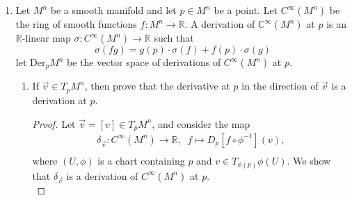 \documentclass{article}
\begin{document}
\begin{enumerate}[label={\bf Q\arabic*:}]
\begin{enumerate}
        \begin{proof}
          Let $p\in S^2\setminus\{\infty\}$. Then
          \[\begin{array}{ll}
            &p\; \text{is a critical point of}\; g \\
            \Leftrightarrow &\exists q\in\phi^{-1}(p)\; \text{such that}\;
              D_qg\; \text{is not surjective} \\
            \Leftrightarrow &D_qg:T_qS^2\rightarrow T_qS^2\; \text{is not
              an isomorphism} \\
            \Leftrightarrow &D_qg\; \text{has no inverse} \\
            \Leftrightarrow &\text{Det}(D_{\phi(a)}\phi\circ
              g\circ\phi^{-1})=0 \\
            \Leftrightarrow &\text{Det}(D_{\phi(a)}f)=0 \\
            \Leftrightarrow &\text{Det}(D_pf)=0 \\
            \Leftrightarrow &f^{-1}(p)=0. \\
          \end{array}\]
        \end{proof}
    \end{enumerate}

  \item Let $M^n$ be a smooth manifold and let $p\in M^n$ be a point. Let
    $C^\infty(M^n)$ be the ring of smooth functions $f:M^n\to\mathbb{R}$. A
    derivation of $\mathbb{C}^\infty(M^n)$ at $p$ is an $\mathbb{R}$-linear
    map $\sigma:C^\infty(M^n)\to\mathbb{R}$ such that
    \[\sigma(fg)=g(p)\cdot \sigma(f)+f(p)\cdot\sigma(g)\] let
    $\text{Der}_pM^n$ be the vector space of derivations of $C^\infty(M^n)$
    at $p$.

    \begin{enumerate}
      \item If $\vec{v}\in T_pM^n$, then prove that the derivative at $p$
        in the direction of $\vec{v}$ is a derivation at $p$.
        \begin{proof}
          Let $\vec{v}=[v]\in T_pM^n$, and consider the map
          \begin{align*}
            \delta_{\vec{v}}:C^\infty(M^n)\rightarrow\mathbb{R},\;\; f\mapsto
            D_p[f\circ\phi^{-1}](v), \\
          \end{align*}
          where $(U,\phi)$ is a chart containing $p$ and $v\in
          T_{\phi(p)}\phi(U)$. We show that $\delta_{\vec{v}}$ is a
          derivation of $C^\infty(M^n)$ at $p$. \\


\end{proof}
\end{enumerate}
\end{enumerate}
\end{document}
